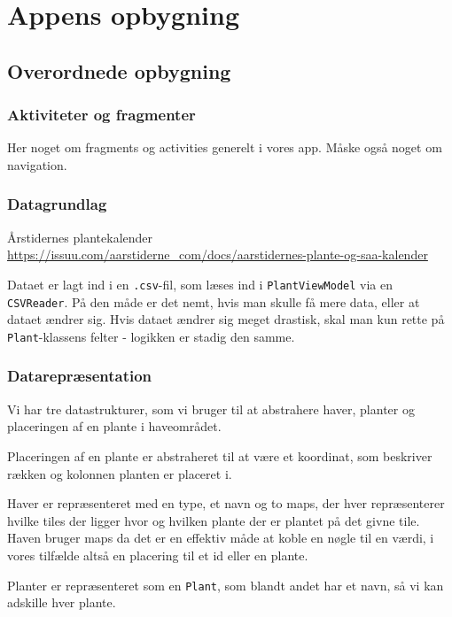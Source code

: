 \section{Appens opbygning}

\subsection{Overordnede opbygning}

\subsubsection{Aktiviteter og fragmenter}
Her noget om fragments og activities generelt i vores app. Måske også noget om navigation.

\subsubsection{Datagrundlag}
Årstidernes plantekalender \hyperlink{https://issuu.com/aarstiderne\_com/docs/aarstidernes-plante-og-saa-kalender}{https://issuu.com/aarstiderne\_com/docs/aarstidernes-plante-og-saa-kalender}

Dataet er lagt ind i en \texttt{.csv}-fil, som læses ind i \texttt{PlantViewModel} via en \texttt{CSVReader}. På den måde er det nemt, hvis man skulle få mere data, eller at dataet ændrer sig. Hvis dataet ændrer sig meget drastisk, skal man kun rette på \texttt{Plant}-klassens felter - logikken er stadig den samme.

\subsubsection{Datarepræsentation}

Vi har tre datastrukturer, som vi bruger til at abstrahere haver, planter og placeringen af en plante i haveområdet.

Placeringen af en plante er abstraheret til at være et koordinat, som beskriver rækken og kolonnen planten er placeret i.

Haver er repræsenteret med en type, et navn og to maps, der hver repræsenterer hvilke tiles der ligger hvor og hvilken plante der er plantet på det givne tile.
Haven bruger maps da det er en effektiv måde at koble en nøgle til en værdi, i vores tilfælde altså en placering til et id eller en plante.

Planter er repræsenteret som en \texttt{Plant}, som blandt andet har et navn, så vi kan adskille hver plante.

